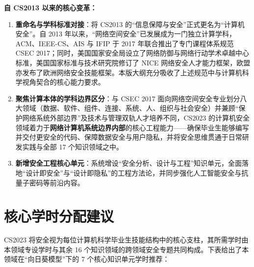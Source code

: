 \begin{preamblebox}[知识领域概述与变革]
\textbf{自 CS2013 以来的核心变革：}
\begin{enumerate}\setlength{\itemsep}{0pt}\setlength{\parskip}{0pt}
    \item \textbf{重命名与学科标准对接}：将 CS2013 的“信息保障与安全”正式更名为“计算机安全”。自 2013 年以来，“网络空间安全”已发展成为一门独立计算学科，ACM、IEEE-CS、AIS 与 IFIP 于 2017 年联合推出了专门课程体系规范 CSEC 2017；同时，美国国家安全局设立了网络防御与网络行动学术卓越中心标准，美国国家标准与技术研究院修订了 NICE 网络安全人才能力框架，欧盟亦发布了欧洲网络安全技能框架。本版大纲充分吸收了上述规范中与计算机科学视角契合的核心能力要求。
    \item \textbf{聚焦计算本体的学科边界区分}：与 CSEC 2017 面向网络空间安全专业划分八大领域（数据、软件、组件、连接、系统、人、组织与社会安全）并兼顾“保护网络系统外部边界”及技术与管理双轨人才培养不同，CS2023 的计算机安全领域着力于\textbf{网络计算机系统边界内部}的核心工程能力——确保毕业生能够编写并交付更安全的代码、保障数据安全与用户隐私，并将安全思维贯通于日常研发实践与全部 17 个知识领域之中。
    \item \textbf{新增安全工程核心单元}：系统增设“安全分析、设计与工程”知识单元，全面落地“设计即安全”与“设计即隐私”的工程方法论，并同步强化人工智能安全与抗量子密码等前沿内容。
\end{enumerate}
\end{preamblebox}

\section{核心学时分配建议}

CS2023 将安全视为每位计算机科学毕业生技能结构中的核心支柱，其所需学时由本领域专设学时与其余 16 个知识领域的跨领域安全专题共同构成。下表给出了本领域在“向日葵模型”下的 7 个核心知识单元学时推荐：

